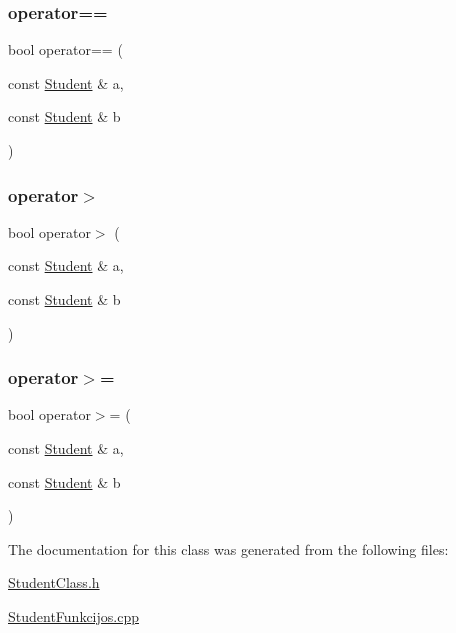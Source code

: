 \mbox{\label{class_student_a3964d3cf585d930b3e6c9eb6379ba41f}} 
\subsubsection{\texorpdfstring{operator==}{operator==}}
{\footnotesize\ttfamily bool operator== (\begin{DoxyParamCaption}\item[{const \mbox{\hyperlink{class_student}{Student}} \&}]{a,  }\item[{const \mbox{\hyperlink{class_student}{Student}} \&}]{b }\end{DoxyParamCaption})\hspace{0.3cm}{\ttfamily [friend]}}

\mbox{\label{class_student_a8e8f9cb02695bbd70ae3f6af951d59c0}} 
\subsubsection{\texorpdfstring{operator$>$}{operator>}}
{\footnotesize\ttfamily bool operator$>$ (\begin{DoxyParamCaption}\item[{const \mbox{\hyperlink{class_student}{Student}} \&}]{a,  }\item[{const \mbox{\hyperlink{class_student}{Student}} \&}]{b }\end{DoxyParamCaption})\hspace{0.3cm}{\ttfamily [friend]}}

\mbox{\label{class_student_ac4cc7f272c704f41a99407c32130ea0f}} 
\subsubsection{\texorpdfstring{operator$>$=}{operator>=}}
{\footnotesize\ttfamily bool operator$>$= (\begin{DoxyParamCaption}\item[{const \mbox{\hyperlink{class_student}{Student}} \&}]{a,  }\item[{const \mbox{\hyperlink{class_student}{Student}} \&}]{b }\end{DoxyParamCaption})\hspace{0.3cm}{\ttfamily [friend]}}



The documentation for this class was generated from the following files\+:\begin{DoxyCompactItemize}
\item 
\mbox{\hyperlink{_student_class_8h}{Student\+Class.\+h}}\item 
\mbox{\hyperlink{_student_funkcijos_8cpp}{Student\+Funkcijos.\+cpp}}\end{DoxyCompactItemize}
